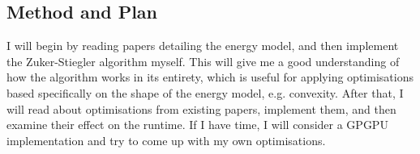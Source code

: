 \documentclass{cshonours}
\begin{document}
\begin{appendices}
\section*{Method and Plan}
I will begin by reading papers detailing the energy model, and then implement the Zuker-Stiegler algorithm myself. This will give me a good understanding of how the algorithm works in its entirety, which is useful for applying optimisations based specifically on the shape of the energy model, e.g. convexity. After that, I will read about optimisations from existing papers, implement them, and then examine their effect on the runtime. If I have time, I will consider a GPGPU implementation and try to come up with my own optimisations.

\end{appendices}



\end{document}
